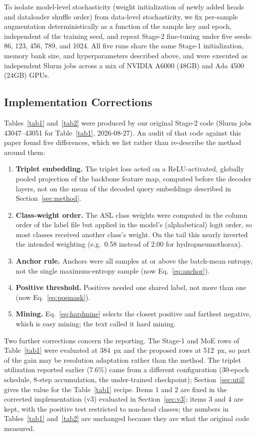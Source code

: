 \documentclass[conference]{IEEEtran}
\begin{document}
To isolate model-level stochasticity (weight initialization of newly added heads and dataloader shuffle order) from data-level stochasticity, we fix per-sample augmentation deterministically as a function of the sample key and epoch, independent of the training seed, and repeat Stage-2 fine-tuning under five seeds: 86, 123, 456, 789, and 1024. All five runs share the same Stage-1 initialization, memory bank size, and hyperparameters described above, and were executed as independent Slurm jobs across a mix of NVIDIA A6000 (48GB) and Ada 4500 (24GB) GPUs.

\subsection{Implementation Corrections}
\label{sec:corrections}
Tables~\ref{tab1} and~\ref{tab2} were produced by our original Stage-2 code (Slurm jobs 43047--43051 for Table~\ref{tab1}, 2026-08-27). An audit of that code against this paper found five differences, which we list rather than re-describe the method around them:
\begin{enumerate}
\item \textbf{Triplet embedding.} The triplet loss acted on a ReLU-activated, globally pooled projection of the backbone feature map, computed before the decoder layers, not on the mean of the decoded query embeddings described in Section~\ref{sec:method}.
\item \textbf{Class-weight order.} The ASL class weights were computed in the column order of the label file but applied in the model's (alphabetical) logit order, so most classes received another class's weight. On the tail this nearly inverted the intended weighting (e.g.\ 0.58 instead of 2.00 for hydropneumothorax).
\item \textbf{Anchor rule.} Anchors were all samples at or above the batch-mean entropy, not the single maximum-entropy sample (now Eq.~\ref{eq:anchor}).
\item \textbf{Positive threshold.} Positives needed one shared label, not more than one (now Eq.~\ref{eq:posmask}).
\item \textbf{Mining.} Eq.~\ref{eq:hardmine} selects the closest positive and farthest negative, which is easy mining; the text called it hard mining.
\end{enumerate}
Two further corrections concern the reporting. The Stage-1 and MoE rows of Table~\ref{tab1} were evaluated at 384~px and the proposed rows at 512~px, so part of the gain may be resolution adaptation rather than the method. The triplet utilization reported earlier (7.6\%) came from a different configuration (30-epoch schedule, 8-step accumulation, the under-trained checkpoint); Section~\ref{sec:util} gives the value for the Table~\ref{tab1} recipe. Items 1 and 2 are fixed in the corrected implementation (v3) evaluated in Section~\ref{sec:v3}; items 3 and 4 are kept, with the positive test restricted to non-head classes; the numbers in Tables~\ref{tab1} and~\ref{tab2} are unchanged because they are what the original code measured.
\end{document}
